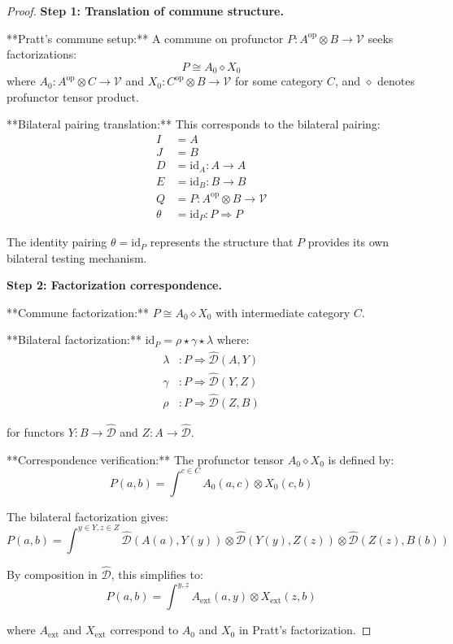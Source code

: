 \documentclass[11pt]{article}
\theoremstyle{plain}
\theoremstyle{definition}
\theoremstyle{remark}
\newcommand{\V}{\mathcal{V}}
\newcommand{\op}{\mathrm{op}}
\newcommand{\wh}[1]{\widehat{#1}}
\begin{document}
\begin{proof}
\textbf{Step 1: Translation of commune structure.}

**Pratt's commune setup:** A commune on profunctor $P : A^{\op} \otimes B \to \V$ seeks factorizations:
$$P \cong A_0 \diamond X_0$$
where $A_0 : A^{\op} \otimes C \to \V$ and $X_0 : C^{\op} \otimes B \to \V$ for some category $C$, and $\diamond$ denotes profunctor tensor product.

**Bilateral pairing translation:** This corresponds to the bilateral pairing:
\begin{align}
I &= A \\
J &= B \\
D &= \text{id}_A : A \to A \\
E &= \text{id}_B : B \to B \\
Q &= P : A^{\op} \otimes B \to \V \\
\theta &= \text{id}_P : P \Rightarrow P
\end{align}

The identity pairing $\theta = \text{id}_P$ represents the structure that $P$ provides its own bilateral testing mechanism.

\textbf{Step 2: Factorization correspondence.}

**Commune factorization:** $P \cong A_0 \diamond X_0$ with intermediate category $C$.

**Bilateral factorization:** $\text{id}_P = \rho \star \gamma \star \lambda$ where:
\begin{align}
\lambda &: P \Rightarrow \wh{\mathcal{D}}(A, Y) \\
\gamma &: P \Rightarrow \wh{\mathcal{D}}(Y, Z) \\
\rho &: P \Rightarrow \wh{\mathcal{D}}(Z, B)
\end{align}

for functors $Y : B \to \wh{\mathcal{D}}$ and $Z : A \to \wh{\mathcal{D}}$.

**Correspondence verification:** The profunctor tensor $A_0 \diamond X_0$ is defined by:
$$P(a, b) = \int^{c \in C} A_0(a, c) \otimes X_0(c, b)$$

The bilateral factorization gives:
$$P(a, b) = \int^{y \in Y, z \in Z} \wh{\mathcal{D}}(A(a), Y(y)) \otimes \wh{\mathcal{D}}(Y(y), Z(z)) \otimes \wh{\mathcal{D}}(Z(z), B(b))$$

By composition in $\wh{\mathcal{D}}$, this simplifies to:
$$P(a, b) = \int^{y, z} A_{\text{ext}}(a, y) \otimes X_{\text{ext}}(z, b)$$

where $A_{\text{ext}}$ and $X_{\text{ext}}$ correspond to $A_0$ and $X_0$ in Pratt's factorization.


\end{proof}
\end{document}
